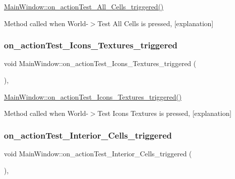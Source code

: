 \hyperlink{class_main_window_a7ba69db7e0da3b95a98c3207deaabacb}{Main\+Window\+::on\+\_\+action\+Test\+\_\+\+All\+\_\+\+Cells\+\_\+triggered()} 

Method called when World-\/$>$Test All Cells is pressed, \mbox{[}explanation\mbox{]} \mbox{\label{class_main_window_a772b1c26a74f70f9ecbe3348926cdd2c}} 
\subsubsection{\texorpdfstring{on\+\_\+action\+Test\+\_\+\+Icons\+\_\+\+Textures\+\_\+triggered}{on\_actionTest\_Icons\_Textures\_triggered}}
{\footnotesize\ttfamily void Main\+Window\+::on\+\_\+action\+Test\+\_\+\+Icons\+\_\+\+Textures\+\_\+triggered (\begin{DoxyParamCaption}{ }\end{DoxyParamCaption})\hspace{0.3cm}{\ttfamily [private]}, {\ttfamily [slot]}}



\hyperlink{class_main_window_a772b1c26a74f70f9ecbe3348926cdd2c}{Main\+Window\+::on\+\_\+action\+Test\+\_\+\+Icons\+\_\+\+Textures\+\_\+triggered()} 

Method called when World-\/$>$Test Icons Textures is pressed, \mbox{[}explanation\mbox{]} \mbox{\label{class_main_window_af1dd399ccee2cf368432256a4c8cfc36}} 
\subsubsection{\texorpdfstring{on\+\_\+action\+Test\+\_\+\+Interior\+\_\+\+Cells\+\_\+triggered}{on\_actionTest\_Interior\_Cells\_triggered}}
{\footnotesize\ttfamily void Main\+Window\+::on\+\_\+action\+Test\+\_\+\+Interior\+\_\+\+Cells\+\_\+triggered (\begin{DoxyParamCaption}{ }\end{DoxyParamCaption})\hspace{0.3cm}{\ttfamily [private]}, {\ttfamily [slot]}}



